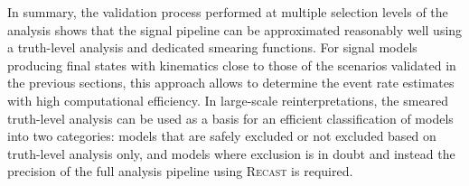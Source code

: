In summary, the validation process performed at multiple selection levels of the analysis shows that the signal pipeline can be approximated reasonably well using a truth-level analysis and dedicated smearing functions. For signal models producing final states with kinematics close to those of the scenarios validated in the previous sections, this approach allows to determine the event rate estimates with high computational efficiency. In large-scale reinterpretations, the smeared truth-level analysis can be used as a basis for an efficient classification of models into two categories: models that are safely excluded or not excluded based on truth-level analysis only, and models where exclusion is in doubt and instead the precision of the full analysis pipeline using \textsc{Recast} is required.


